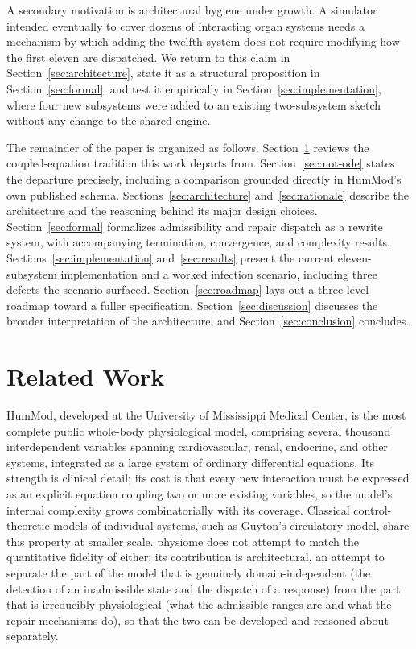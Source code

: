 \documentclass[11pt]{article}
\begin{document}
A secondary motivation is architectural hygiene under growth. A simulator intended eventually to cover dozens of interacting organ systems needs a mechanism by which adding the twelfth system does not require modifying how the first eleven are dispatched. We return to this claim in Section~\ref{sec:architecture}, state it as a structural proposition in Section~\ref{sec:formal}, and test it empirically in Section~\ref{sec:implementation}, where four new subsystems were added to an existing two-subsystem sketch without any change to the shared engine.

The remainder of the paper is organized as follows. Section~\ref{sec:related} reviews the coupled-equation tradition this work departs from. Section~\ref{sec:not-ode} states the departure precisely, including a comparison grounded directly in HumMod's own published schema. Sections~\ref{sec:architecture} and~\ref{sec:rationale} describe the architecture and the reasoning behind its major design choices. Section~\ref{sec:formal} formalizes admissibility and repair dispatch as a rewrite system, with accompanying termination, convergence, and complexity results. Sections~\ref{sec:implementation} and~\ref{sec:results} present the current eleven-subsystem implementation and a worked infection scenario, including three defects the scenario surfaced. Section~\ref{sec:roadmap} lays out a three-level roadmap toward a fuller specification. Section~\ref{sec:discussion} discusses the broader interpretation of the architecture, and Section~\ref{sec:conclusion} concludes.

\section{Related Work}
\label{sec:related}

HumMod, developed at the University of Mississippi Medical Center, is the most complete public whole-body physiological model, comprising several thousand interdependent variables spanning cardiovascular, renal, endocrine, and other systems, integrated as a large system of ordinary differential equations. Its strength is clinical detail; its cost is that every new interaction must be expressed as an explicit equation coupling two or more existing variables, so the model's internal complexity grows combinatorially with its coverage. Classical control-theoretic models of individual systems, such as Guyton's circulatory model, share this property at smaller scale. physiome does not attempt to match the quantitative fidelity of either; its contribution is architectural, an attempt to separate the part of the model that is genuinely domain-independent (the detection of an inadmissible state and the dispatch of a response) from the part that is irreducibly physiological (what the admissible ranges are and what the repair mechanisms do), so that the two can be developed and reasoned about separately.
\end{document}
